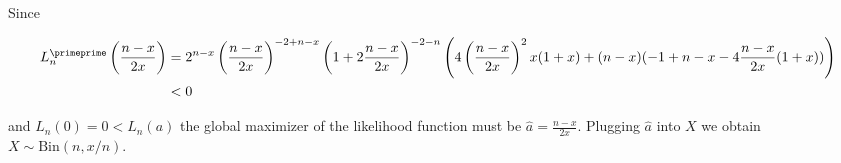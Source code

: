 \begin{solution}
Since

\begin{align*}
  L_n^{\primeprime}\left(\frac{n-x}{2x}\right) &= 2^{n - x} \left(\frac{n-x}{2x}\right)^{-2 + n - x}
  \left(1 + 2 \frac{n-x}{2x}\right)^{-2 - n}
  \left(4 \left(\frac{n-x}{2x}\right)^2 x (1 + x) + (n - x) (-1 + n - x - 4 \frac{n-x}{2x} (1 + x))\right) \\
  &< 0
\end{align*}

and $L_n(0) = 0 < L_n(a)$ the global maximizer of the likelihood function must be $\hat{a} = \frac{n - x}{2x}$.
Plugging $\hat{a}$ into $X$ we obtain $X \sim \text{Bin}(n, x/n)$.
\end{solution}

